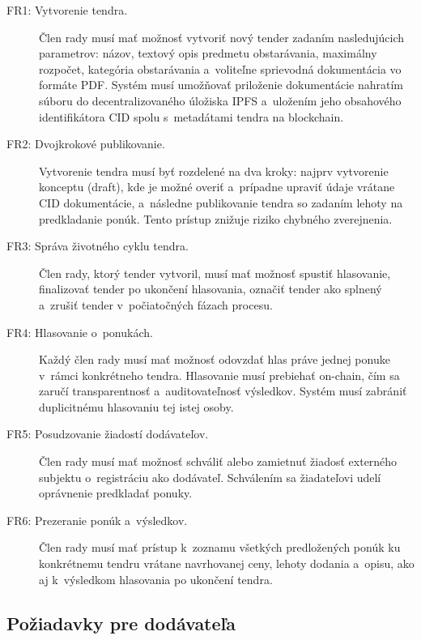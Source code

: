 \begin{description}
    \item[FR1: Vytvorenie tendra.] Člen rady musí mať možnosť vytvoriť
    nový tender zadaním nasledujúcich parametrov: názov, textový opis
    predmetu obstarávania, maximálny rozpočet, kategória obstarávania
    a~voliteľne sprievodná dokumentácia vo formáte PDF. Systém musí
    umožňovať priloženie dokumentácie nahratím súboru do
    decentralizovaného úložiska IPFS a~uložením jeho obsahového
    identifikátora CID spolu s~metadátami tendra na blockchain.

    \item[FR2: Dvojkrokové publikovanie.] Vytvorenie tendra musí byť
    rozdelené na dva kroky: najprv vytvorenie konceptu (draft), kde je
    možné overiť a~prípadne upraviť údaje vrátane CID dokumentácie,
    a~následne publikovanie tendra so zadaním lehoty na predkladanie
    ponúk. Tento prístup znižuje riziko chybného zverejnenia.

    \item[FR3: Správa životného cyklu tendra.] Člen rady, ktorý
    tender vytvoril, musí mať možnosť spustiť hlasovanie, finalizovať
    tender po ukončení hlasovania, označiť tender ako splnený
    a~zrušiť tender v~počiatočných fázach procesu.

    \item[FR4: Hlasovanie o~ponukách.] Každý člen rady musí mať
    možnosť odovzdať hlas práve jednej ponuke v~rámci konkrétneho
    tendra. Hlasovanie musí prebiehať on-chain, čím sa zaručí
    transparentnosť a~auditovateľnosť výsledkov. Systém musí
    zabrániť duplicitnému hlasovaniu tej istej osoby.

    \item[FR5: Posudzovanie žiadostí dodávateľov.] Člen rady musí
    mať možnosť schváliť alebo zamietnuť žiadosť externého
    subjektu o~registráciu ako dodávateľ. Schválením sa žiadateľovi
    udelí oprávnenie predkladať ponuky.

    \item[FR6: Prezeranie ponúk a~výsledkov.] Člen rady musí mať
    prístup k~zoznamu všetkých predložených ponúk ku konkrétnemu
    tendru vrátane navrhovanej ceny, lehoty dodania a~opisu, ako aj
    k~výsledkom hlasovania po ukončení tendra.
\end{description}

\subsection{Požiadavky pre dodávateľa}
\label{subsec:fr_vendor}

